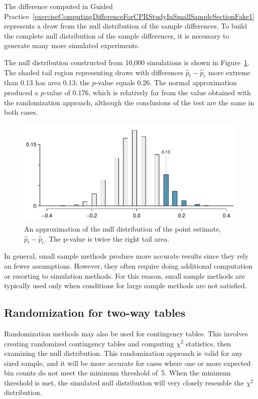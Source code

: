 The difference computed in Guided Practice~\ref{exerciseComputingDifferenceForCPRStudyInSmallSampleSectionFake1} represents a draw from the null distribution of the sample differences. To build the complete null distribution of the sample differences, it is necessary to generate many more simulated experiments.

The null distribution constructed from 10,000 simulations is shown in Figure~\ref{pValueCPRStudySmallSampleAnalysisInSmallSampleSection}. The shaded tail region representing draws with differences $\hat{p}_t - \hat{p}_c$ more extreme than 0.13 has area 0.13; the $p$-value equals 0.26. The normal approximation produced a $p$-value of 0.176, which is relatively far from the value obtained with the randomization approach, although the conclusions of the test are the same in both cases. 

\begin{figure}[ht]
\centering
\includegraphics[width=\textwidth]{ch_inference_for_props_oi_biostat/figures/pValueCPRStudySmallSampleAnalysisInSmallSampleSection/pValueCPRStudySmallSampleAnalysisInSmallSampleSection}
\caption{An approximation of the null distribution of the point estimate, $\hat{p}_t - \hat{p}_c$. The p-value is twice the right tail area.}
\label{pValueCPRStudySmallSampleAnalysisInSmallSampleSection}
\end{figure}

In general, small sample methods produce more accurate results since they rely on fewer assumptions. However, they often require doing additional computation or resorting to simulation methods. For this reason, small sample methods are typically used only when conditions for large sample methods are not satisfied.

\subsection{Randomization for two-way tables}

Randomization methods may also be used for contingency tables. This involves creating randomized contingency tables and computing $\chi^2$ statistics, then examining the null distribution. This randomization approach is valid for any sized sample, and it will be more accurate for cases where one or more expected bin counts do not meet the minimum threshold of~5. When the minimum threshold is met, the simulated null distribution will very closely resemble the $\chi^2$ distribution. 

